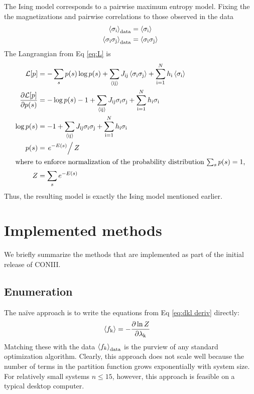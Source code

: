 \documentclass[aps,prl,twocolumn]{revtex4-1}
\begin{document}
The Ising model corresponds to a pairwise maximum entropy model.
Fixing the the magnetizations and pairwise correlations to those observed in the data
\begin{align}
	\left<\sigma_{\rm i}\right>_{\rm data} &= \left<\sigma_{\rm i}\right>\\
	\left<\sigma_{\rm i}\sigma_{\rm j}\right>_{\rm data} &= \left<\sigma_{\rm i}\sigma_{\rm j}\right>
\end{align}
The Langrangian from Eq \ref{eq:L} is
\begin{align}
	\mathcal{L}[p] &= -\sum_s p(s)\log p(s) +\sum_{\rm \left<ij\right>} J_{\rm ij}\left<\sigma_{\rm i}\sigma_{\rm j}\right> +\sum_{\rm i=1}^Nh_{\rm i}\left<\sigma_{\rm i}\right>\\
	\frac{\partial\mathcal{L}[p]}{\partial p(s)} &= -\log p(s)-1 +\sum_{\rm \left<ij\right>} J_{\rm ij}\sigma_{\rm i}\sigma_{\rm j} +\sum_{\rm i=1}^Nh_{\rm i}\sigma_{\rm i}\\
	\log p(s) &= -1 +\sum_{\rm \left<ij\right>} J_{\rm ij}\sigma_{\rm i}\sigma_{\rm j} +\sum_{\rm i=1}^Nh_{\rm i}\sigma_{\rm i}\\
	p(s) &= \left.e^{-E(s)}\right/Z\\
\intertext{where to enforce normalization of the probability distribution $\sum_s p(s) = 1$,}
	Z &= \sum_s e^{-E(s)}
\end{align}
Thus, the resulting model is exactly the Ising model mentioned earlier.



\section{Implemented methods}
We briefly summarize the methods that are implemented as part of the initial release of CONIII.

\subsection{Enumeration}
The na\"{i}ve approach is to write the equations from Eq \ref{eq:dkl deriv} directly:
\begin{align}
	\left<f_{\rm k}\right> &= -\frac{\partial \ln Z}{\partial \lambda_{\rm k}}
\end{align}
Matching these with the data $\left<f_k\right>_{\rm data}$ is the purview of any standard optimization algorithm. Clearly, this approach does not scale well because the number of terms in the partition function grows exponentially with system size. For relatively small systems $n\leq15$, however, this approach is feasible on a typical desktop computer.
\end{document}
